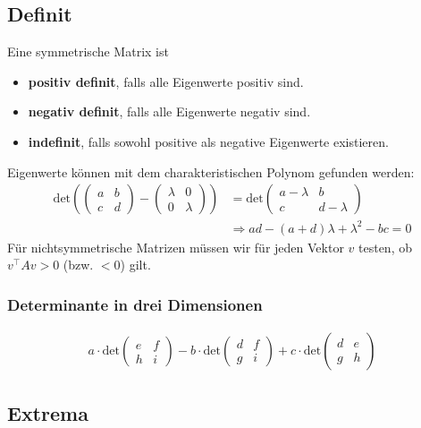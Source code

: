 \documentclass[a4paper,10pt]{article}
\begin{document}
\subsection{Definit}
Eine symmetrische Matrix ist
\begin{itemize}
  \item \textbf{positiv definit}, falls alle Eigenwerte positiv sind.
  \item \textbf{negativ definit}, falls alle Eigenwerte negativ sind.
  \item \textbf{indefinit}, falls sowohl positive als negative Eigenwerte existieren.
\end{itemize}
Eigenwerte können mit dem charakteristischen Polynom gefunden werden:
\begin{align*}
  \text{det} \left(
  \begin{pmatrix}
    a & b\\
    c & d
  \end{pmatrix}
  -
  \begin{pmatrix}
    \lambda & 0\\
    0 & \lambda
  \end{pmatrix}
  \right)
  &=
  \text{det}
  \begin{pmatrix}
    a - \lambda & b\\
    c & d - \lambda
  \end{pmatrix}\\
  &\Rightarrow ad - (a + d) \lambda + \lambda^2 - bc = 0
\end{align*}
Für nichtsymmetrische Matrizen müssen wir für jeden Vektor \(v\) testen, ob \(v^\top A v > 0\) (bzw. \(< 0\)) gilt.
\subsubsection*{Determinante in drei Dimensionen}
\begin{align*}
  a \cdot \text{det}
  \begin{pmatrix}
    e & f\\
    h & i
  \end{pmatrix}
  - b \cdot \text{det}
  \begin{pmatrix}
    d & f\\
    g & i
  \end{pmatrix}
  + c \cdot \text{det}
  \begin{pmatrix}
    d & e\\
    g & h
  \end{pmatrix}
\end{align*}
\subsection{Extrema}
\end{document}
